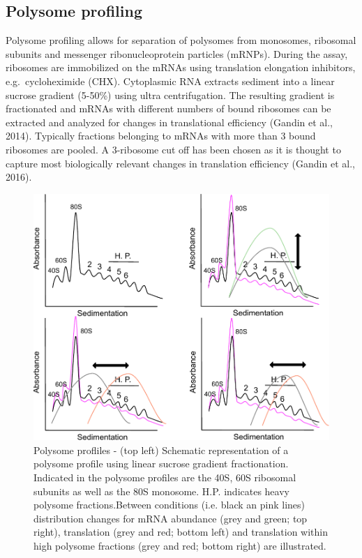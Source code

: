 \documentclass[12pt,openany]{book}
\begin{document}
\subsection{Polysome profiling}

Polysome profiling allows for separation of polysomes from monosomes,
ribosomal subunits and messenger ribonucleoprotein particles (mRNPs).
During the assay, ribosomes are immobilized on the mRNAs using
translation elongation inhibitors, e.g.~cycloheximide (CHX). Cytoplasmic
RNA extracts sediment into a linear sucrose gradient (5-50\%) using
ultra centrifugation. The resulting gradient is fractionated and mRNAs
with different numbers of bound ribosomes can be extracted and analyzed
for changes in translational efficiency (Gandin et al., 2014). Typically
fractions belonging to mRNAs with more than 3 bound ribosomes are
pooled. A 3-ribosome cut off has been chosen as it is thought to capture
most biologically relevant changes in translation efficiency (Gandin et
al., 2016).

\begin{figure}
    \includegraphics[width=0.9\linewidth]{./figures/polysome_shifts.pdf}
  \caption{Polysome profliles -  (top left) Schematic representation of a polysome profile using linear sucrose gradient fractionation. Indicated in the polysome profiles are the 40S, 60S ribosomal subunits as well as the 80S monosome. H.P. indicates heavy polysome fractions.Between conditions (i.e. black an pink lines) distribution changes for mRNA abundance (grey and green; top right), translation (grey and red; bottom left) and translation within high polysome fractions (grey and red; bottom right) are illustrated. \label{fig:polysome}}
\end{figure}
\end{document}
